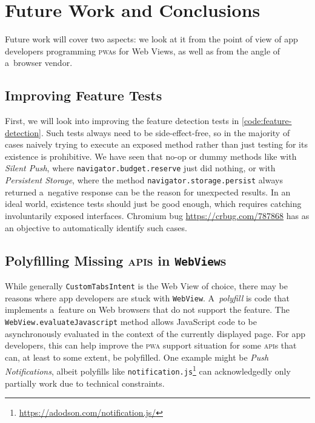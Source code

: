 \documentclass[sigconf]{acmart}
\begin{document}
\section{Future Work and Conclusions}
\label{sec:future-work-conclusions}

Future work will cover two aspects:
we look at it from the point of view of app developers
programming \textsc{pwa}s for Web Views,
as well as from the angle of a~browser vendor.

\subsection{Improving Feature Tests}

First, we will look into improving the feature detection tests in
\autoref{code:feature-detection}.
Such tests always need to be side-effect-free,
so in the majority of cases naively trying to execute an exposed method
rather than just testing for its existence is prohibitive.
We have seen that no-op or dummy methods like with \emph{Silent Push},
where \texttt{navigator.budget.reserve} just did nothing,
or with \emph{Persistent Storage}, 
where the method \texttt{navigator.storage.persist} always returned a~negative response
can be the reason for unexpected results.
In an ideal world, existence tests should just be good enough,
which requires catching involuntarily exposed interfaces.
Chromium bug \url{https://crbug.com/787868} has as an objective
to automatically identify such cases.

\subsection{Polyfilling Missing \textsc{api}s in \texttt{WebView}s}

While generally \texttt{CustomTabsIntent} is the Web View of choice,
there may be reasons where app developers are stuck with \texttt{WebView}.
A~\emph{polyfill} is code that implements a~feature on Web browsers
that do not support the feature.
The \texttt{WebView.evaluateJavascript} method allows JavaScript code to be 
asynchronously evaluated in the context of the currently displayed page.
For app developers, this can help improve
the \textsc{pwa} support situation for some \textsc{api}s
that can, at least to some extent, be polyfilled.
One example might be \emph{Push Notifications},
albeit polyfills like \texttt{notification.js}\footnote{\url{https://adodson.com/notification.js/}} 
can acknowledgedly only partially work due to technical constraints.
\end{document}
